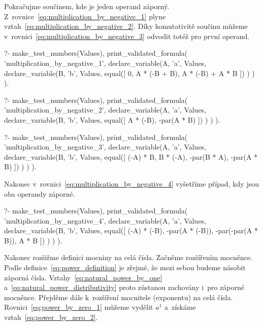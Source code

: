 Pokračujme součinem, kde je jeden operand záporný. Z~rovnice~\eqref{eq:multiplication_by_negative_1} plyne vztah~\eqref{eq:multiplication_by_negative_2}. Díky komutativitě součinu můžeme v~rovnici~\eqref{eq:multiplication_by_negative_3} odvodit totéž pro první operand. 

\begin{prolog}
?-	make_test_numbers(Values),
	print_validated_formula(
		'multiplication_by_negative_1',
		declare_variable(A, 'a', Values,
			declare_variable(B, 'b', Values,
				equal([
					0,
					A * (-B + B),
					A * (-B) + A * B
				])
			)
		)
	).
\end{prolog}
\begin{prolog}
?-	make_test_numbers(Values),
	print_validated_formula(
		'multiplication_by_negative_2',
		declare_variable(A, 'a', Values,
			declare_variable(B, 'b', Values,
				equal([
					A * (-B), -par(A * B)
				])
			)
		)
	).
\end{prolog}
\begin{prolog}
?-	make_test_numbers(Values),
	print_validated_formula(
		'multiplication_by_negative_3',
		declare_variable(A, 'a', Values,
			declare_variable(B, 'b', Values,
				equal([
					(-A) * B,
					B * (-A),
					-par(B * A),
					-par(A * B)
				])
			)
		)
	).
\end{prolog}

Nakonec v~rovnici~\eqref{eq:multiplication_by_negative_4} vyšetříme případ, kdy jsou oba operandy záporné.

\begin{prolog}
?-	make_test_numbers(Values),
	print_validated_formula(
		'multiplication_by_negative_4',
		declare_variable(A, 'a', Values,
			declare_variable(B, 'b', Values,
				equal([
					(-A) * (-B),
					-par(A * (-B)),
					-par(-par(A * B)),
					A * B
				])
			)
		)
	).
\end{prolog}

Nakonec rozšiřme definici mocniny na celá čísla. Začněme rozšířením mocněnce. Podle definice~\eqref{eq:power_definition} je zřejmé, že mezi sebou budeme násobit záporná čísla. Vztahy~\eqref{eq:natural_power_by_one} a~\eqref{eq:natural_power_distributivity} proto zůstanou zachovány i~pro záporné mocněnce. Přejděme dále k~rozšíření mocnitele (exponentu) na celá čísla. Rovnici~\eqref{eq:power_by_zero_1} můžeme vydělit \(a^1\) a~získáme vztah~\eqref{eq:power_by_zero_2}.

